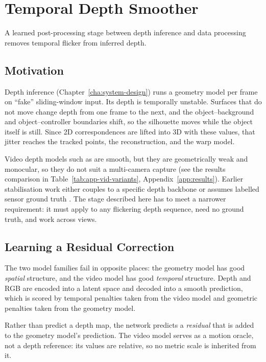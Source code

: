 \chapter{Temporal Depth Smoother}
\label{cha:smoother}

A learned post-processing stage between depth inference and data processing removes temporal
flicker from inferred depth.

\section{Motivation}
\label{sec:smoother-motivation}

Depth inference (Chapter~\ref{cha:system-design}) runs a geometry model per frame on ``fake''
sliding-window input. Its depth is temporally unstable. Surfaces that do not move change depth from
one frame to the next, and the object--background and object--controller boundaries shift, so the
silhouette moves while the object itself is still. Since 2D correspondences are lifted into 3D with
these values, that jitter reaches the tracked points, the reconstruction, and the warp model.

Video depth models such as \textcite{vda} are smooth, but they are geometrically weak and monocular,
so they do not suit a multi-camera capture (see the results comparison in Table~\ref{tab:app-vid-variants}, Appendix~\ref{app:results}). Earlier stabilisation work either couples to a specific
depth backbone \parencite{nvds,nvdsp} or assumes labelled sensor ground truth
\parencite{stabledpt,li2023consistent}. The stage described here has to meet a narrower requirement:
it must apply to any flickering depth sequence, need no ground truth, and work across views.

\section{Learning a Residual Correction}
\label{sec:smoother-idea}

The two model families fail in opposite places: the geometry model has good \emph{spatial}
structure, and the video model has good \emph{temporal} structure. Depth and RGB are encoded into a
latent space and decoded into a smooth prediction, which is scored by temporal penalties taken from
the video model and geometric penalties taken from the geometry model.

Rather than predict a depth map, the network predicts a \emph{residual} that is added to the geometry
model's prediction. The video model serves as a motion oracle, not a depth reference: its values are
relative, so no metric scale is inherited from it.

